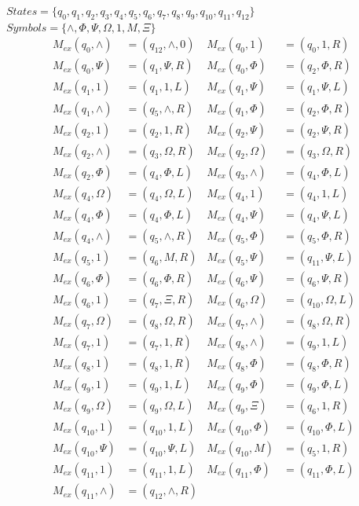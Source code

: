 \documentclass[11pt]{article}
\begin{document}
$States = \{q_0, q_1, q_2, q_3, q_4, q_5, q_6, q_7, q_8, q_9, q_{10}, q_{11}, q_{12}\}$\\
$Symbols = \{\wedge, \Phi, \Psi, \Omega, 1, M, \Xi \}$
\begin{align*}
M_{ex}(q_0, \wedge) &= (q_{12}, \wedge, 0)    &     M_{ex}(q_0, 1) &= (q_{0}, 1, R) \\
M_{ex}(q_{0}, \Psi) &= (q_{1}, \Psi, R)    &     M_{ex}(q_{0}, \Phi) &= (q_{2}, \Phi, R) \\
M_{ex}(q_{1}, 1) &= (q_{1}, 1, L)    &     M_{ex}(q_{1}, \Psi) &= (q_{1}, \Psi, L) \\
M_{ex}(q_{1}, \wedge) &= (q_{5}, \wedge, R)    &     M_{ex}(q_{1}, \Phi) &= (q_{2}, \Phi, R) \\
M_{ex}(q_{2}, 1) &= (q_{2}, 1, R)    &     M_{ex}(q_{2}, \Psi) &= (q_{2}, \Psi, R) \\
M_{ex}(q_{2}, \wedge) &= (q_{3}, \Omega, R)    &     M_{ex}(q_{2}, \Omega) &= (q_{3}, \Omega, R) \\
M_{ex}(q_{2}, \Phi) &= (q_{4}, \Phi, L)    &     M_{ex}(q_{3}, \wedge) &= (q_{4}, \Phi, L) \\
M_{ex}(q_{4}, \Omega) &= (q_{4}, \Omega, L)    &     M_{ex}(q_{4}, 1) &= (q_{4}, 1, L) \\
M_{ex}(q_{4}, \Phi) &= (q_{4}, \Phi, L)    &     M_{ex}(q_{4}, \Psi) &= (q_{4}, \Psi, L) \\
M_{ex}(q_{4}, \wedge) &= (q_{5}, \wedge, R)    &     M_{ex}(q_{5}, \Phi) &= (q_{5}, \Phi, R) \\
M_{ex}(q_{5}, 1) &= (q_{6}, M, R)    &     M_{ex}(q_{5}, \Psi) &= (q_{11}, \Psi, L) \\
M_{ex}(q_{6}, \Phi) &= (q_{6}, \Phi, R)    &     M_{ex}(q_{6}, \Psi) &= (q_{6}, \Psi, R) \\
M_{ex}(q_{6}, 1) &= (q_{7}, \Xi, R)    &     M_{ex}(q_{6}, \Omega) &= (q_{10}, \Omega, L) \\
M_{ex}(q_{7}, \Omega) &= (q_{8}, \Omega, R)    &     M_{ex}(q_{7}, \wedge) &= (q_{8}, \Omega, R) \\
M_{ex}(q_{7}, 1) &= (q_{7}, 1, R)	&	M_{ex}(q_{8}, \wedge) &= (q_{9}, 1, L) \\
M_{ex}(q_{8}, 1) &= (q_{8}, 1, R)	&	M_{ex}(q_{8}, \Phi) &= (q_{8}, \Phi, R) \\
M_{ex}(q_{9}, 1) &= (q_{9}, 1, L)	&	M_{ex}(q_{9}, \Phi) &= (q_{9}, \Phi, L) \\
M_{ex}(q_{9}, \Omega) &= (q_{9}, \Omega, L)	&	M_{ex}(q_{9}, \Xi) &= (q_{6}, 1, R) \\
M_{ex}(q_{10}, 1) &= (q_{10}, 1, L)	&	M_{ex}(q_{10}, \Phi) &= (q_{10}, \Phi, L) \\
M_{ex}(q_{10}, \Psi) &= (q_{10}, \Psi, L)	&	M_{ex}(q_{10}, M) &= (q_{5}, 1, R) \\
M_{ex}(q_{11}, 1) &= (q_{11}, 1, L)	&	M_{ex}(q_{11}, \Phi) &= (q_{11}, \Phi, L) \\
M_{ex}(q_{11}, \wedge) &= (q_{12}, \wedge, R)	 \\
\end{align*}
\end{document}
